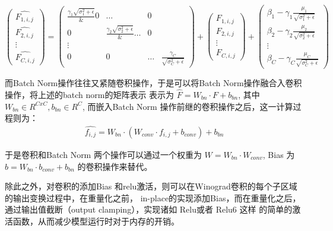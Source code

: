 \begin{equation}
\label{eq:bn_matvec}
	\begin{pmatrix}
		\hat{F_{1,i,j}} \\
		\hat{F_{2,i,j}} \\
		\vdots \\
		\hat{F_{C,i,j}}
	\end{pmatrix}
	=
	\begin{pmatrix}
		\frac{\gamma_{1}{\sqrt{\sigma_{1}^2 + \epsilon}}} & 0 & \dots & 0 \\
		0 & \frac{\gamma_{2}{\sqrt{\sigma_{2}^2 + \epsilon}}}  & \dots & 0 \\
		\vdots \\
	        0 & 0 & \dots & \frac{\gamma_{C}}{\sqrt{\sigma_{C}^2 + \epsilon}}
	\end{pmatrix}
	+
	\begin{pmatrix}
		F_{1,i,j} \\
		F_{2,i,j} \\
		\vdots \\
		F_{C,i,j}
	\end{pmatrix}
	+ 
	\begin{pmatrix}
		\beta_{1} - \gamma_1 \frac{\mu_1}{\sqrt{\sigma_1^2 + \epsilon}}\\
		\beta_{2} - \gamma_2 \frac{\mu_2}{\sqrt{\sigma_2^2 + \epsilon}}\\
		\vdots \\
		\beta_{C} - \gamma_C \frac{\mu_C}{\sqrt{\sigma_C^2 + \epsilon}}
	\end{pmatrix}
\end{equation}

而Batch Norm操作往往又紧随卷积操作，于是可以将Batch Norm操作融合入卷积操作，将上述的batch norm的矩阵表示\label{eq:bn_matvec}
表示为 $\hat{F} = W_{bn} \cdot F + b_{bn}$, 其中 $W_{bn} \in R^{CxC}, b_{bn} \in R^C$, 而嵌入Batch Norm 
操作前继的卷积操作之后，这一计算过程则为：
\begin{align}
\hat{f_{i,j}} = W_{bn} \cdot (W_{conv} \cdot f_{i,j} + b_{conv}) + b_{bn}
\end{align}

于是卷积和Batch Norm 两个操作可以通过一个权重为 $W = W_{bn} \cdot W_{conv}$, Bias 为 $b = W_{bn} \cdot b_{conv} + b_{bn}$
的卷积操作来替代。

除此之外，对卷积的添加Bias 和relu激活，则可以在Winograd卷积的每个子区域的输出变换过程中，在重量化之前，
in-place的实现添加Bias，而在重量化之后，通过输出值截断（output clamping），实现诸如 Relu或者 Relu6 这样
的简单的激活函数，从而减少模型运行时对于内存的开销。



